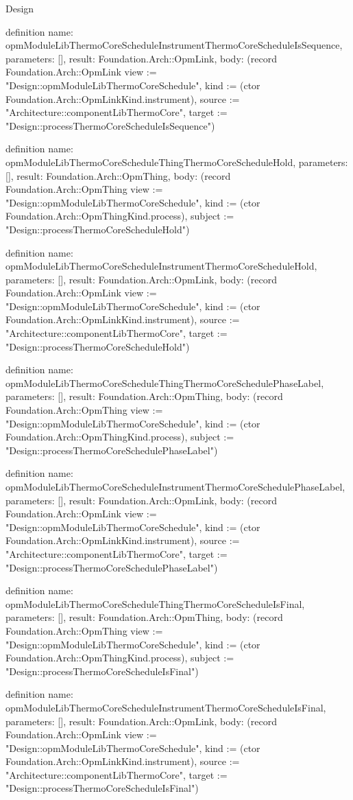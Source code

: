 \begin{lexlean}{Design}
\begin{semanticmodule}
definition{
  name: opmModuleLibThermoCoreScheduleInstrumentThermoCoreScheduleIsSequence,
  parameters: [],
  result: Foundation.Arch::OpmLink,
  body: (record Foundation.Arch::OpmLink {view := "Design::opmModuleLibThermoCoreSchedule", kind := (ctor Foundation.Arch::OpmLinkKind.instrument), source := "Architecture::componentLibThermoCore", target := "Design::processThermoCoreScheduleIsSequence"})
}

definition{
  name: opmModuleLibThermoCoreScheduleThingThermoCoreScheduleHold,
  parameters: [],
  result: Foundation.Arch::OpmThing,
  body: (record Foundation.Arch::OpmThing {view := "Design::opmModuleLibThermoCoreSchedule", kind := (ctor Foundation.Arch::OpmThingKind.process), subject := "Design::processThermoCoreScheduleHold"})
}

definition{
  name: opmModuleLibThermoCoreScheduleInstrumentThermoCoreScheduleHold,
  parameters: [],
  result: Foundation.Arch::OpmLink,
  body: (record Foundation.Arch::OpmLink {view := "Design::opmModuleLibThermoCoreSchedule", kind := (ctor Foundation.Arch::OpmLinkKind.instrument), source := "Architecture::componentLibThermoCore", target := "Design::processThermoCoreScheduleHold"})
}

definition{
  name: opmModuleLibThermoCoreScheduleThingThermoCoreSchedulePhaseLabel,
  parameters: [],
  result: Foundation.Arch::OpmThing,
  body: (record Foundation.Arch::OpmThing {view := "Design::opmModuleLibThermoCoreSchedule", kind := (ctor Foundation.Arch::OpmThingKind.process), subject := "Design::processThermoCoreSchedulePhaseLabel"})
}

definition{
  name: opmModuleLibThermoCoreScheduleInstrumentThermoCoreSchedulePhaseLabel,
  parameters: [],
  result: Foundation.Arch::OpmLink,
  body: (record Foundation.Arch::OpmLink {view := "Design::opmModuleLibThermoCoreSchedule", kind := (ctor Foundation.Arch::OpmLinkKind.instrument), source := "Architecture::componentLibThermoCore", target := "Design::processThermoCoreSchedulePhaseLabel"})
}

definition{
  name: opmModuleLibThermoCoreScheduleThingThermoCoreScheduleIsFinal,
  parameters: [],
  result: Foundation.Arch::OpmThing,
  body: (record Foundation.Arch::OpmThing {view := "Design::opmModuleLibThermoCoreSchedule", kind := (ctor Foundation.Arch::OpmThingKind.process), subject := "Design::processThermoCoreScheduleIsFinal"})
}

definition{
  name: opmModuleLibThermoCoreScheduleInstrumentThermoCoreScheduleIsFinal,
  parameters: [],
  result: Foundation.Arch::OpmLink,
  body: (record Foundation.Arch::OpmLink {view := "Design::opmModuleLibThermoCoreSchedule", kind := (ctor Foundation.Arch::OpmLinkKind.instrument), source := "Architecture::componentLibThermoCore", target := "Design::processThermoCoreScheduleIsFinal"})
}


\end{semanticmodule}
\end{lexlean}
